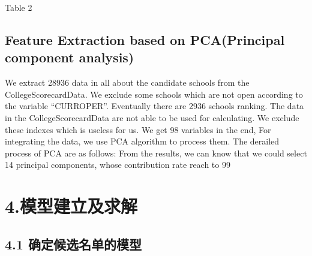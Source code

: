 Table 2

\subsection{Feature Extraction based on PCA(Principal component analysis)}
We extract 28936 data in all about the candidate schools from the CollegeScorecardData. We exclude some schools which are not open according to the variable “CURROPER”. Eventually there are 2936 schools ranking. The data in the CollegeScorecardData are not able to be used for calculating. We exclude these indexes which is useless for us. We get 98 variables in the end,
For integrating the data, we use PCA algorithm to process them. The derailed process of PCA are as follows: 
From the results, we can know that we could select 14 principal components, whose contribution rate reach to 99%


\section{4.模型建立及求解}
\subsection{4.1 确定候选名单的模型}

